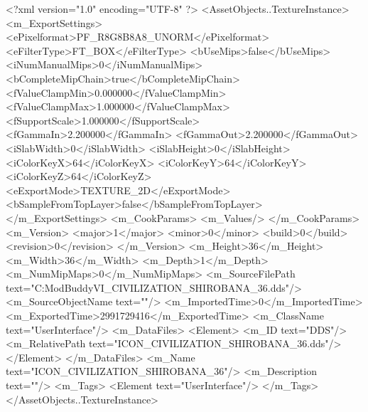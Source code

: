 <?xml version="1.0" encoding="UTF-8" ?>
<AssetObjects..TextureInstance>
	<m_ExportSettings>
		<ePixelformat>PF_R8G8B8A8_UNORM</ePixelformat>
		<eFilterType>FT_BOX</eFilterType>
		<bUseMips>false</bUseMips>
		<iNumManualMips>0</iNumManualMips>
		<bCompleteMipChain>true</bCompleteMipChain>
		<fValueClampMin>0.000000</fValueClampMin>
		<fValueClampMax>1.000000</fValueClampMax>
		<fSupportScale>1.000000</fSupportScale>
		<fGammaIn>2.200000</fGammaIn>
		<fGammaOut>2.200000</fGammaOut>
		<iSlabWidth>0</iSlabWidth>
		<iSlabHeight>0</iSlabHeight>
		<iColorKeyX>64</iColorKeyX>
		<iColorKeyY>64</iColorKeyY>
		<iColorKeyZ>64</iColorKeyZ>
		<eExportMode>TEXTURE_2D</eExportMode>
		<bSampleFromTopLayer>false</bSampleFromTopLayer>
	</m_ExportSettings>
	<m_CookParams>
		<m_Values/>
	</m_CookParams>
	<m_Version>
		<major>1</major>
		<minor>0</minor>
		<build>0</build>
		<revision>0</revision>
	</m_Version>
	<m_Height>36</m_Height>
	<m_Width>36</m_Width>
	<m_Depth>1</m_Depth>
	<m_NumMipMaps>0</m_NumMipMaps>
	<m_SourceFilePath text="C:\Users\asus\Documents\Firaxis ModBuddy\Civilization VI\temppic\ICON_CIVILIZATION_SHIROBANA_36.dds"/>
	<m_SourceObjectName text=""/>
	<m_ImportedTime>0</m_ImportedTime>
	<m_ExportedTime>2991729416</m_ExportedTime>
	<m_ClassName text="UserInterface"/>
	<m_DataFiles>
		<Element>
			<m_ID text="DDS"/>
			<m_RelativePath text="ICON_CIVILIZATION_SHIROBANA_36.dds"/>
		</Element>
	</m_DataFiles>
	<m_Name text="ICON_CIVILIZATION_SHIROBANA_36"/>
	<m_Description text=""/>
	<m_Tags>
		<Element text="UserInterface"/>
	</m_Tags>
</AssetObjects..TextureInstance>

